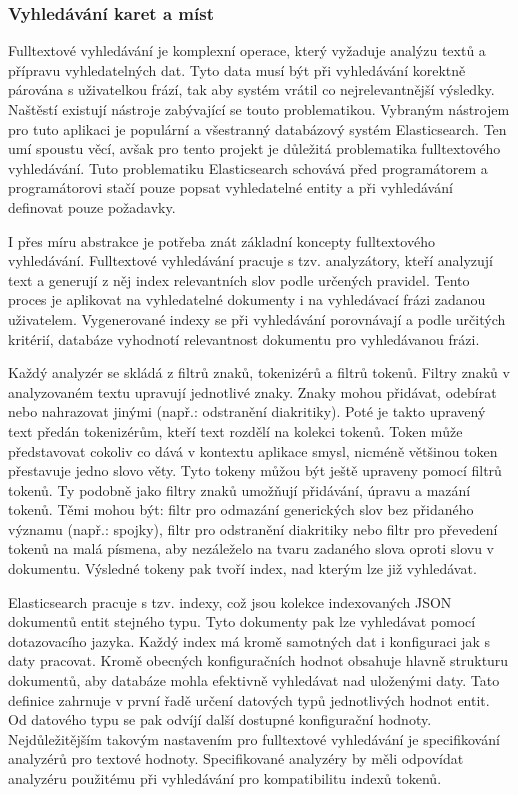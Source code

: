 		\subsubsection{Vyhledávání karet a míst}

		Fulltextové vyhledávání je komplexní operace, který vyžaduje analýzu textů a přípravu vyhledatelných dat.
		Tyto data musí být při vyhledávání korektně párována s uživatelkou frází, tak aby systém vrátil co nejrelevantnější
		výsledky.
		Naštěstí existují nástroje zabývající se touto problematikou.
		Vybraným nástrojem pro tuto aplikaci je populární a všestranný databázový systém Elasticsearch.
		Ten umí spoustu věcí, avšak pro tento projekt je důležitá problematika fulltextového vyhledávání.
		Tuto problematiku Elasticsearch schovává před programátorem a programátorovi stačí pouze popsat
		vyhledatelné entity a při vyhledávání definovat pouze požadavky.

		I přes míru abstrakce je potřeba znát základní koncepty fulltextového vyhledávání.
		Fulltextové vyhledávání pracuje s tzv. analyzátory, kteří analyzují text a generují z něj index relevantních
		slov podle určených pravidel.
		Tento proces je aplikovat na vyhledatelné dokumenty i na vyhledávací frázi zadanou uživatelem.
		Vygenerované indexy se při vyhledávání porovnávají a podle určitých kritérií, databáze vyhodnotí relevantnost
		dokumentu pro vyhledávanou frázi. \cite{index_search_analysis}

		Každý analyzér se skládá z filtrů znaků, tokenizérů a filtrů tokenů.
		Filtry znaků v analyzovaném textu upravují jednotlivé znaky.
		Znaky mohou přidávat, odebírat nebo nahrazovat jinými (např.: odstranění diakritiky).
		Poté je takto upravený text předán tokenizérům, kteří text rozdělí na kolekci tokenů.
		Token může představovat cokoliv co dává v kontextu aplikace smysl, nicméně většinou token přestavuje jedno
		slovo věty.
		Tyto tokeny můžou být ještě upraveny pomocí filtrů tokenů.
		Ty podobně jako filtry znaků umožňují přidávání, úpravu a mazání tokenů.
		Těmi mohou být: filtr pro odmazání generických slov bez přidaného významu (např.: spojky), filtr pro odstranění
		diakritiky nebo filtr pro převedení tokenů na malá písmena, aby nezáleželo na tvaru zadaného slova oproti slovu
		v dokumentu.
		Výsledné tokeny pak tvoří index, nad kterým lze již vyhledávat.
		\cite{analyzer_anatomy}

		Elasticsearch pracuje s tzv. indexy, což jsou kolekce indexovaných \ac{JSON} dokumentů entit stejného typu.
		Tyto dokumenty pak lze vyhledávat pomocí dotazovacího jazyka.
		Každý index má kromě samotných dat i konfiguraci jak s daty pracovat.
		Kromě obecných konfiguračních hodnot obsahuje hlavně strukturu dokumentů, aby databáze mohla efektivně vyhledávat
		nad uloženými daty.
		Tato definice zahrnuje v první řadě určení datových typů jednotlivých hodnot entit.
		Od datového typu se pak odvíjí další dostupné konfigurační hodnoty.
		Nejdůležitějším takovým nastavením pro fulltextové vyhledávání je specifikování analyzérů pro textové hodnoty.
		Specifikované analyzéry by měli odpovídat analyzéru použitému při vyhledávání pro kompatibilitu indexů tokenů.


